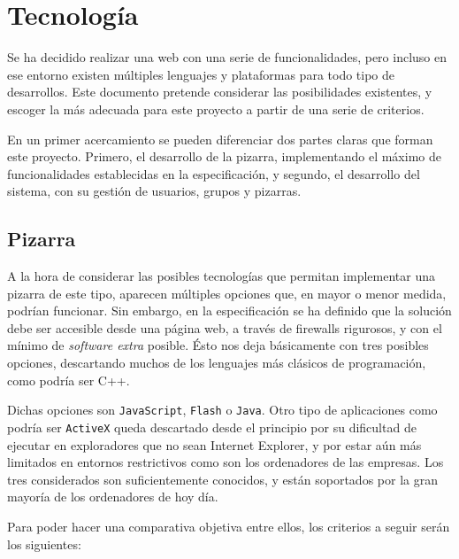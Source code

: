 \section{Tecnolog\'ia} %
\label{sec:tecnologia}

Se ha decidido realizar una web con una serie de funcionalidades, pero incluso en ese entorno existen múltiples lenguajes y plataformas para todo tipo de desarrollos. Este documento pretende considerar las posibilidades existentes, y escoger la más adecuada para este proyecto a partir de una serie de criterios.

En un primer acercamiento se pueden diferenciar dos partes claras que forman este proyecto. Primero, el desarrollo de la pizarra, implementando el máximo de funcionalidades establecidas en la especificación, y segundo, el desarrollo del sistema, con su gestión de usuarios, grupos y pizarras.

\subsection{Pizarra}
A la hora de considerar las posibles tecnologías que permitan implementar una pizarra de este tipo, aparecen múltiples opciones que, en mayor o menor medida, podrían funcionar. Sin embargo, en la especificación se ha definido que la solución debe ser accesible desde una página web, a través de firewalls rigurosos, y con el mínimo de \emph{software extra} posible. Ésto nos deja básicamente con tres posibles opciones, descartando muchos de los lenguajes más clásicos de programación, como podría ser C++.

Dichas opciones son \texttt{JavaScript}, \texttt{Flash} o \texttt{Java}. Otro tipo de aplicaciones como podría ser \texttt{ActiveX} queda descartado desde el principio por su dificultad de ejecutar en exploradores que no sean Internet Explorer, y por estar aún más limitados en entornos restrictivos como son los ordenadores de las empresas. Los tres considerados son suficientemente conocidos, y están soportados por la gran mayoría de los ordenadores de hoy día.

Para poder hacer una comparativa objetiva entre ellos, los criterios a seguir serán los siguientes:

